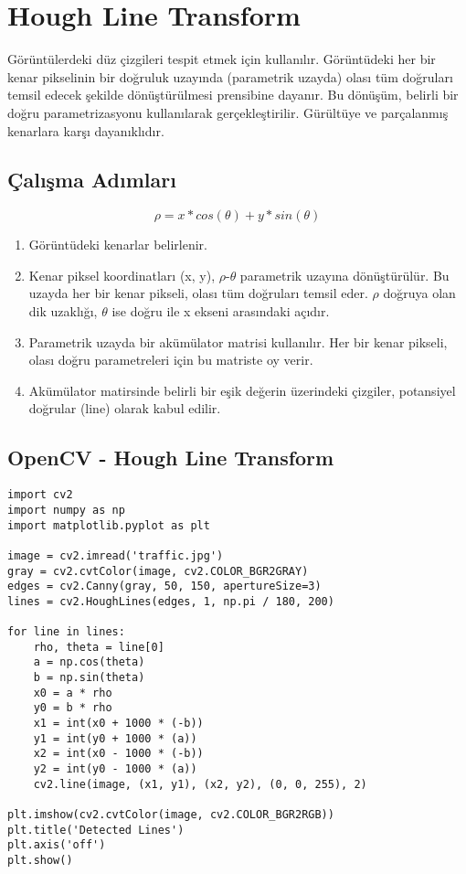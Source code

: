 \section{Hough Line Transform}

Görüntülerdeki düz çizgileri tespit etmek için kullanılır. Görüntüdeki her bir kenar pikselinin bir doğruluk uzayında (parametrik uzayda) olası tüm doğruları temsil edecek şekilde dönüştürülmesi prensibine dayanır. Bu dönüşüm, belirli bir doğru parametrizasyonu kullanılarak gerçekleştirilir. Gürültüye ve parçalanmış kenarlara karşı dayanıklıdır.

\subsection{Çalışma Adımları}
\[ \rho = x * cos(\theta) + y * sin(\theta) \]
\begin{enumerate}
	\item Görüntüdeki kenarlar belirlenir.
	\item Kenar piksel koordinatları (x, y), $\rho$-$\theta$ parametrik uzayına dönüştürülür. Bu uzayda her bir kenar pikseli, olası tüm doğruları temsil eder. $\rho$ doğruya olan dik uzaklığı, $\theta$ ise doğru ile x ekseni arasındaki açıdır.
	\item Parametrik uzayda bir akümülator matrisi kullanılır. Her bir kenar pikseli, olası doğru parametreleri için bu matriste oy verir.
	\item Akümülator matirsinde belirli bir eşik değerin üzerindeki çizgiler, potansiyel doğrular (line) olarak kabul edilir.
\end{enumerate}

\subsection{OpenCV - Hough Line Transform}
\begin{lstlisting}
import cv2
import numpy as np
import matplotlib.pyplot as plt

image = cv2.imread('traffic.jpg')
gray = cv2.cvtColor(image, cv2.COLOR_BGR2GRAY)
edges = cv2.Canny(gray, 50, 150, apertureSize=3)
lines = cv2.HoughLines(edges, 1, np.pi / 180, 200)

for line in lines:
    rho, theta = line[0]
    a = np.cos(theta)
    b = np.sin(theta)
    x0 = a * rho
    y0 = b * rho
    x1 = int(x0 + 1000 * (-b))
    y1 = int(y0 + 1000 * (a))
    x2 = int(x0 - 1000 * (-b))
    y2 = int(y0 - 1000 * (a))
    cv2.line(image, (x1, y1), (x2, y2), (0, 0, 255), 2)

plt.imshow(cv2.cvtColor(image, cv2.COLOR_BGR2RGB))
plt.title('Detected Lines')
plt.axis('off')
plt.show()
\end{lstlisting}

\newpage